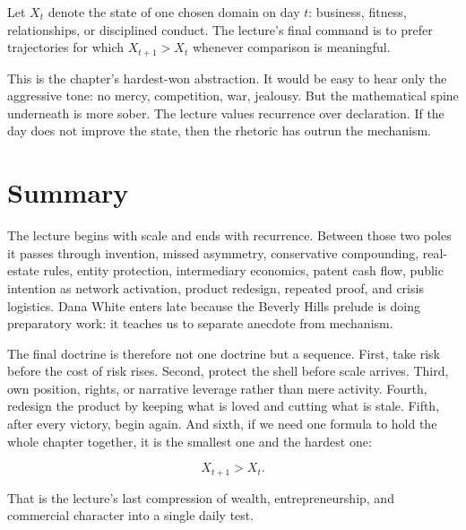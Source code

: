 \begin{definition}
Let \(X_t\) denote the state of one chosen domain on day \(t\): business, fitness, relationships, or disciplined conduct. The lecture's final command is to prefer trajectories for which \(X_{t+1} > X_t\) whenever comparison is meaningful.
\end{definition}

This is the chapter's hardest-won abstraction. It would be easy to hear only the aggressive tone: no mercy, competition, war, jealousy. But the mathematical spine underneath is more sober. The lecture values recurrence over declaration. If the day does not improve the state, then the rhetoric has outrun the mechanism.

\section{Summary}

The lecture begins with scale and ends with recurrence. Between those two poles it passes through invention, missed asymmetry, conservative compounding, real-estate rules, entity protection, intermediary economics, patent cash flow, public intention as network activation, product redesign, repeated proof, and crisis logistics. Dana White enters late because the Beverly Hills prelude is doing preparatory work: it teaches us to separate anecdote from mechanism.

The final doctrine is therefore not one doctrine but a sequence. First, take risk before the cost of risk rises. Second, protect the shell before scale arrives. Third, own position, rights, or narrative leverage rather than mere activity. Fourth, redesign the product by keeping what is loved and cutting what is stale. Fifth, after every victory, begin again. And sixth, if we need one formula to hold the whole chapter together, it is the smallest one and the hardest one:

\begin{equation}
X_{t+1} > X_t.
\end{equation}

That is the lecture's last compression of wealth, entrepreneurship, and commercial character into a single daily test.